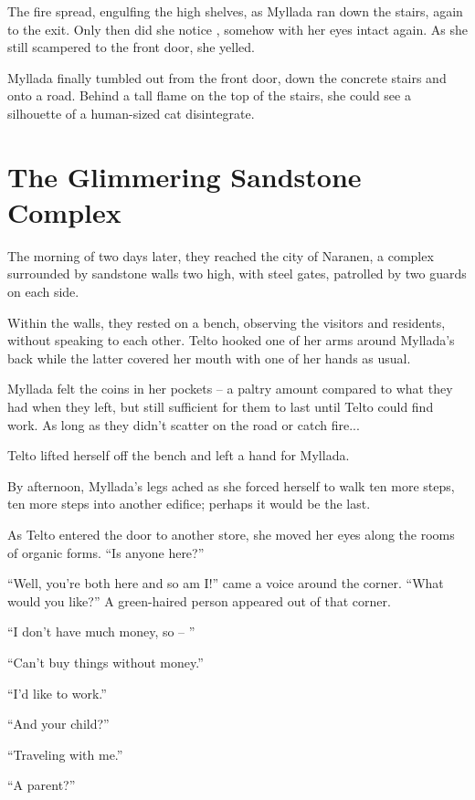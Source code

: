 The fire spread, engulfing the high shelves, as Myllada ran down the stairs, again to the exit. Only then did she notice \yronsyncra, somehow with her eyes intact again. As she still scampered to the front door, she yelled.

Myllada finally tumbled out from the front door, down the concrete stairs and onto a road. Behind a tall flame on the top of the stairs, she could see a silhouette of a human-sized cat disintegrate.

\chapter{The Glimmering Sandstone Complex}

The morning of two days later, they reached the city of Naranen, a complex surrounded by sandstone walls two \vetyr{} high, with steel gates, patrolled by two guards on each side.

Within the walls, they rested on a bench, observing the visitors and residents, without speaking to each other. Telto hooked one of her arms around Myllada's back while the latter covered her mouth with one of her hands as usual.

Myllada felt the coins in her pockets -- a paltry amount compared to what they had when they left, but still sufficient for them to last until Telto could find work. As long as they didn't scatter on the road or catch fire...

Telto lifted herself off the bench and left a hand for Myllada.

\centeredstars

By afternoon, Myllada's legs ached as she forced herself to walk ten more steps, ten more steps into another edifice; perhaps it would be the last.

As Telto entered the door to another store, she moved her eyes along the rooms of organic forms. ``Is anyone here?''

``Well, you're both here and so am I!'' came a voice around the corner. ``What would you like?'' A green-haired person appeared out of that corner.

``I don't have much money, so -- ''

``Can't buy things without money.''

``I'd like to work.''

``And your child?''

``Traveling with me.''

``A parent?''

